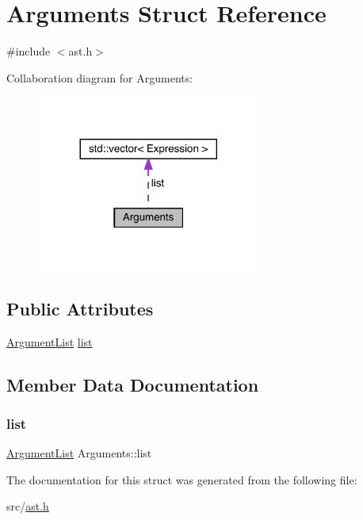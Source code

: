 \hypertarget{struct_arguments}{}\section{Arguments Struct Reference}
\label{struct_arguments}


{\ttfamily \#include $<$ast.\+h$>$}



Collaboration diagram for Arguments\+:\nopagebreak
\begin{figure}[H]
\begin{center}
\leavevmode
\includegraphics[width=209pt]{struct_arguments__coll__graph}
\end{center}
\end{figure}
\subsection*{Public Attributes}
\begin{DoxyCompactItemize}
\item 
\hyperlink{ast_8h_a31fcc1ca3d32657e8eb6f1433e97d2c9}{Argument\+List} \hyperlink{struct_arguments_aabd86069d52c369cfb9a9041fc991a83}{list}
\end{DoxyCompactItemize}


\subsection{Member Data Documentation}
\mbox{\label{struct_arguments_aabd86069d52c369cfb9a9041fc991a83}} 
\subsubsection{\texorpdfstring{list}{list}}
{\footnotesize\ttfamily \hyperlink{ast_8h_a31fcc1ca3d32657e8eb6f1433e97d2c9}{Argument\+List} Arguments\+::list}



The documentation for this struct was generated from the following file\+:\begin{DoxyCompactItemize}
\item 
src/\hyperlink{ast_8h}{ast.\+h}\end{DoxyCompactItemize}
